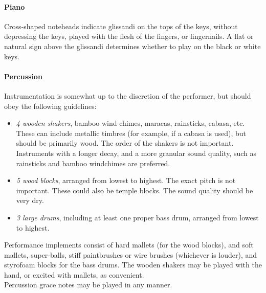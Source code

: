\documentclass[11pt]{report}
\begin{document}
\begin{titlepage}
\begin{multicols}{3}
{    \paragraph{Piano}

    Cross-shaped noteheads indicate glissandi on the tops of the keys, without
    depressing the keys, played with the flesh of the fingers, or fingernails.
    A flat or natural sign above the glissandi determines whether to play on
    the black or white keys.

    \paragraph{Percussion}
    
    Instrumentation is somewhat up to the discretion of the performer, but
    should obey the following guidelines:

    \begin{itemize}
        
        \item \emph{4 wooden shakers}, bamboo wind-chimes, maracas, rainsticks,
        cabasa, etc. These can include metallic timbres (for example, if a
        cabasa is used), but should be primarily wood. The order of the shakers
        is not important.  Instruments with a longer decay, and a more granular
        sound quality, such as rainsticks and bamboo windchimes are preferred.

        \item \emph{5 wood blocks}, arranged from lowest to highest.  The
        exact pitch is not important. These could also be temple blocks. The
        sound quality should be very dry.

        \item \emph{3 large drums}, including at least one proper bass drum,
        arranged from lowest to highest.

    \end{itemize}

    Performance implements consist of hard mallets (for the wood blocks), and
    soft mallets, super-balls, stiff paintbrushes or wire brushes (whichever is
    louder), and styrofoam blocks for the bass drums. The wooden shakers may be
    played with the hand, or excited with mallets, as convenient.\\

    Percussion grace notes may be played in any manner.
    
}

\end{multicols}
\end{titlepage}
\end{document}
